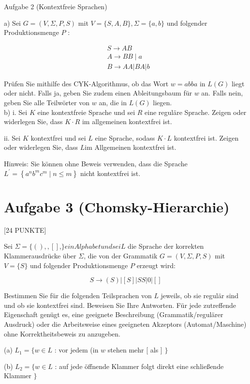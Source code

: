 \documentclass[10pt]{article}
\begin{document}
Aufgabe 2 (Kontextfreie Sprachen)

a) Sei $G=(V, \Sigma, P, S)$ mit $V=\{S, A, B\}, \Sigma=\{a, b\}$ und folgender Produktionsmenge $P$ :

$$
\begin{aligned}
& S \rightarrow A B \\
& A \rightarrow B B \mid a \\
& B \rightarrow A A|B A| b
\end{aligned}
$$

Prüfen Sie mithilfe des CYK-Algorithmus, ob das Wort $w=a b b a$ in $L(G)$ liegt oder nicht. Falls ja, geben Sie zudem einen Ableitungsbaum für $w$ an. Falls nein, geben Sie alle Teilwörter von $w$ an, die in $L(G)$ liegen.\\
b) i. Sei $K$ eine kontextfreie Sprache und sei $R$ eine reguläre Sprache. Zeigen oder widerlegen Sie, dass $K \cdot R$ im allgemeinen kontextfrei ist.

ii. Sei $K$ kontextfrei und sei $L$ eine Sprache, sodass $K \cdot L$ kontextfrei ist. Zeigen oder widerlegen Sie, dass $L \mathrm{im}$ Allgemeinen kontextfrei ist.

Hinweis: Sie können ohne Beweis verwenden, dass die Sprache $L^{\prime}=\left\{a^{n} b^{m} c^{m} \mid n \leq m\right\}$ nicht kontextfrei ist.

\section*{Aufgabe 3 (Chomsky-Hierarchie)}
[24 PUNKTE]

Sei $\Sigma=\{(),,[]$,$\} ein Alphabet und sei L$ die Sprache der korrekten Klammerausdrücke über $\Sigma$, die von der Grammatik $G=(V, \Sigma, P, S)$ mit $V=\{S\}$ und folgender Produktionsmenge $P$ erzeugt wird:

$$
S \rightarrow(S)|[S]| S S|0|[]
$$

Bestimmen Sie für die folgenden Teilsprachen von $L$ jeweils, ob sie regulär sind und ob sie kontextfrei sind. Beweisen Sie Ihre Antworten. Für jede zutreffende Eigenschaft genügt es, eine geeignete Beschreibung (Grammatik/regulärer Ausdruck) oder die Arbeitsweise eines geeigneten Akzeptors (Automat/Maschine) ohne Korrektheitsbeweis zu anzugeben.

(a) $L_{1}=\{w \in L$ : vor jedem (in $w$ stehen mehr [ als ] $\}$

(b) $L_{2}=\{w \in L$ : auf jede öffnende Klammer folgt direkt eine schließende Klammer $\}$
\end{document}
